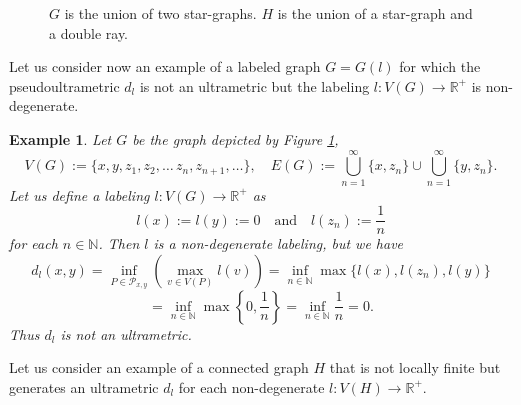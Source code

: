 \documentclass[pdflatex,sn-mathphys-num]{sn-jnl}%
\theoremstyle{thmstyleone}%
\theoremstyle{thmstyletwo}%
\newtheorem{Example}[Theorem]{Example}
\theoremstyle{thmstylethree}%
\theoremstyle{thmstyletwo}%
\theoremstyle{thmstylethree}%
\begin{document}
\begin{figure}[ht]
\begin{minipage}[c]{0.48\textwidth}
\end{minipage}

\caption{$G$ is the union of two star-graphs. $H$ is the union of a star-graph and a double ray.}
\label{f3}
\end{figure}







Let us consider now an example of a labeled graph $G = G(l)$ for which the pseudoultrametric $d_l$ is not an ultrametric but
the labeling $l :V(G)\to \mathbb{R}^+$ is non-degenerate.



\begin{Example}\label{rdwwdd} Let $G$ be the graph depicted by Figure \ref{f3},
\[
V(G):=\{x, y, z_1, z_2, \dots\,z_n, z_{n+1},\ldots\},
\quad
E(G) := \bigcup_{n=1}^\infty \{x, z_n\} \cup \bigcup_{n=1}^\infty \{y, z_n\}.
\]
Let us define a labeling $l : V(G)\to \mathbb{R}^+$ as
\[
l(x) := l(y) := 0
\quad
\text {and} \quad 
l(z_n) := \frac{1}{n} 
\]
for each $n \in \mathbb N$.
Then $l$ is a non-degenerate labeling, but
 we have
\[
d_l(x,y) = \inf_{P \in \mathcal{P}_{x,y}} \left(\max_{v \in V(P)} l(v)\right)
= \inf_{n \in \mathbb{N}} \max\{l(x), l(z_n), l(y)\}
\]
\[
= \inf_{n \in \mathbb{N}} \max\left\{0, \frac{1}{n}\right\}
= \inf_{n \in \mathbb{N}} \frac{1}{n} = 0.
\]
Thus $d_l$ is not an ultrametric.
\end{Example}






Let us consider an example of a connected graph $H$ that is not locally finite but generates an ultrametric $d_l$ for each non-degenerate $l : V(H) \to \mathbb{R}^+$.
\end{document}
